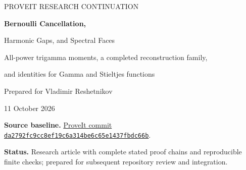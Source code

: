 \documentclass[11pt,a4paper]{article}
\numberwithin{equation}{section}
\theoremstyle{definition}
\theoremstyle{remark}
\begin{document}
\hypersetup{pageanchor=false}
\begin{titlepage}
\vspace*{15mm}
{\sffamily\color{ResearchBlue}\large PROVEIT RESEARCH CONTINUATION\par}
\vspace{12mm}
{\LARGE\bfseries Bernoulli Cancellation,\par
Harmonic Gaps, and Spectral Faces\par}
\vspace{7mm}
{\large All-power trigamma moments, a completed reconstruction family,\par
and identities for Gamma and Stieltjes functions\par}
\vspace{13mm}
{\large Prepared for Vladimir Reshetnikov\par}
\vspace{3mm}
{11 October 2026\par}
\vspace{13mm}
\begin{abstract}
We continue several precise research questions in the ProveIt manuscript
and its five incoming reports of 11 October 2026. A single Bernoulli
polynomial identity cancels the finite-cutoff boundary terms for every
power of the trigamma tail. It gives an anchored analytic generator,
a finite multiple-zeta coordinate space at each power, a uniform
extension to all repeated even-order Hurwitz tails, and explicit
fifth- and sixth-power ordinary convergent sums. We determine all Laurent
coefficients on the complementary resonant lattice, including the exact
local convergence radius and Stieltjes normalization. A separate exact
certificate at the previously uncovered index completes the
smaller-order-ten optimal-prefix reconstruction family. For relative
multiple-Hurwitz interpolants we prove closure under finite decorations
and obtain several-marker identities involving log-Gamma products and
normalized Stieltjes primitives. Finally, an explicit subtraction on
every face of a Dirichlet simplex expresses all higher spectral defects
through lower one-mass derivatives; the full zero-jet correction is a
finite rational function and vanishes for mean-zero periodic weights.
Proofs, exact algebraic certificates, numerical diagnostics, a source
audit, and precise further questions are supplied. Statements of rank
refer to specified rational coordinate systems; no numerical period
independence or unproved Gaussian ladder identity is asserted.
\end{abstract}
\vfill
\noindent\textbf{Source baseline.}
\href{https://github.com/VladimirReshetnikov/ProveIt/tree/da2792fc9cc8ef19c6a314be6c65e1437fbdc66b}{ProveIt commit
\texttt{da2792fc9cc8ef19c6a314be6c65e1437fbdc66b}}.\par
\smallskip
\noindent\textbf{Status.} Research article with complete stated proof
chains and reproducible finite checks; prepared for subsequent repository
review and integration.
\end{titlepage}
\hypersetup{pageanchor=true}
\begingroup
\small
\setlength{\parskip}{0pt}
\tableofcontents
\endgroup
\clearpage
{}
\end{document}
